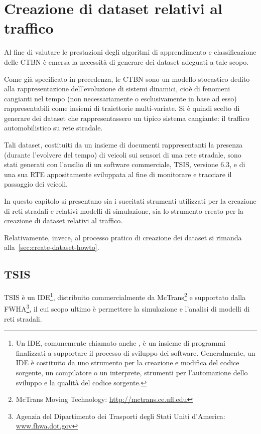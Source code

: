 
\chapter{Creazione di dataset relativi al traffico}
\label{cap:tsis-sensors}
Al fine di valutare le prestazioni degli algoritmi di apprendimento e classificazione delle \acl{CTBN} è emersa la necessità di generare dei dataset adeguati a tale scopo.

Come già specificato in precedenza, le \acs{CTBN} sono un modello stocastico dedito alla rappresentazione dell'evoluzione di sistemi dinamici, cioè di fenomeni cangianti nel tempo (non necessariamente o esclusivamente in base ad esso) rappresentabili come insiemi di traiettorie multi-variate. Si è quindi scelto di generare dei dataset che rappresentassero un tipico sistema cangiante: il traffico automobilistico su rete stradale.

Tali dataset, costituiti da un insieme di documenti rappresentanti la presenza (durante l'evolvere del tempo) di veicoli sui sensori di una rete stradale, sono stati generati con l'ausilio di un software commerciale, \acf{TSIS}, versione 6.3, e di una sua \acl{RTE} appositamente sviluppata al fine di monitorare e tracciare il passaggio dei veicoli. 

In questo capitolo si presentano sia i succitati strumenti utilizzati per la creazione di reti stradali e relativi modelli di simulazione, sia lo strumento creato per la creazione di dataset relativi al traffico.

Relativamente, invece, al processo pratico di creazione dei dataset si rimanda alla~\autoref{sec:create-dataset-howto}.

\section{TSIS}
\label{sec:tsis}
\acf{TSIS} è un \acl{IDE}\footnote{Un \acl{IDE}, comunemente chiamato anche , è un insieme di programmi finalizzati a supportare il processo di sviluppo dei software. Generalmente, un \acs{IDE} è costituito da uno strumento per la creazione e modifica del codice sorgente, un compilatore o un interprete, strumenti per l'automazione dello sviluppo e la qualità del codice sorgente.}, distribuito commercialmente da McTrans\footnote{McTrans Moving Technology: \url{http://mctrans.ce.ufl.edu}} e supportato dalla \acf{FWHA}\footnote{Agenzia del Dipartimento dei Trasporti degli Stati Uniti d'America: \\ \url{www.fhwa.dot.gov}}, il cui scopo ultimo è permettere la simulazione e l'analisi di modelli di reti stradali.

